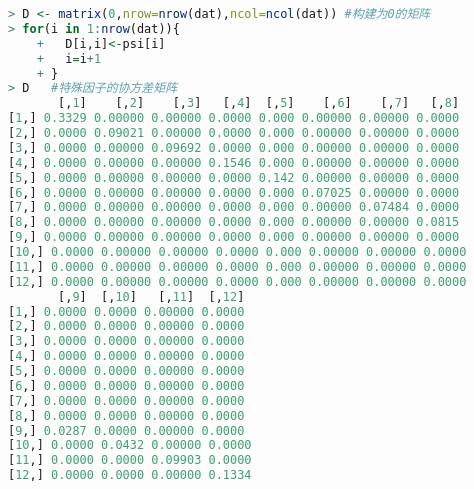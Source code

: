 \documentclass[11pt,a4paper,oneside]{book}
\begin{document}
\begin{lstlisting}[language=r]
> D <- matrix(0,nrow=nrow(dat),ncol=ncol(dat)) #构建为0的矩阵
> for(i in 1:nrow(dat)){
	+   D[i,i]<-psi[i]
	+   i=i+1
	+ }
> D   #特殊因子的协方差矩阵
       [,1]    [,2]    [,3]   [,4]  [,5]    [,6]    [,7]   [,8]
[1,] 0.3329 0.00000 0.00000 0.0000 0.000 0.00000 0.00000 0.0000
[2,] 0.0000 0.09021 0.00000 0.0000 0.000 0.00000 0.00000 0.0000
[3,] 0.0000 0.00000 0.09692 0.0000 0.000 0.00000 0.00000 0.0000
[4,] 0.0000 0.00000 0.00000 0.1546 0.000 0.00000 0.00000 0.0000
[5,] 0.0000 0.00000 0.00000 0.0000 0.142 0.00000 0.00000 0.0000
[6,] 0.0000 0.00000 0.00000 0.0000 0.000 0.07025 0.00000 0.0000
[7,] 0.0000 0.00000 0.00000 0.0000 0.000 0.00000 0.07484 0.0000
[8,] 0.0000 0.00000 0.00000 0.0000 0.000 0.00000 0.00000 0.0815
[9,] 0.0000 0.00000 0.00000 0.0000 0.000 0.00000 0.00000 0.0000
[10,] 0.0000 0.00000 0.00000 0.0000 0.000 0.00000 0.00000 0.0000
[11,] 0.0000 0.00000 0.00000 0.0000 0.000 0.00000 0.00000 0.0000
[12,] 0.0000 0.00000 0.00000 0.0000 0.000 0.00000 0.00000 0.0000
       [,9]  [,10]   [,11]  [,12]
[1,] 0.0000 0.0000 0.00000 0.0000
[2,] 0.0000 0.0000 0.00000 0.0000
[3,] 0.0000 0.0000 0.00000 0.0000
[4,] 0.0000 0.0000 0.00000 0.0000
[5,] 0.0000 0.0000 0.00000 0.0000
[6,] 0.0000 0.0000 0.00000 0.0000
[7,] 0.0000 0.0000 0.00000 0.0000
[8,] 0.0000 0.0000 0.00000 0.0000
[9,] 0.0287 0.0000 0.00000 0.0000
[10,] 0.0000 0.0432 0.00000 0.0000
[11,] 0.0000 0.0000 0.09903 0.0000
[12,] 0.0000 0.0000 0.00000 0.1334
\end{lstlisting}
\end{document}
